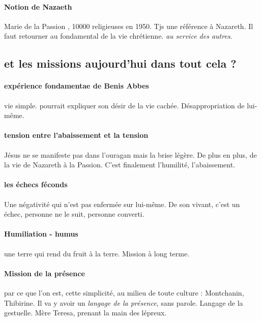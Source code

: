 \paragraph{Notion de Nazaeth} Marie de la Passion , 10000 religieuses en 1950. Tjs une référence à Nazareth. Il faut retourner au fondamental de la vie chrétienne. \textit{au service des autres}. 

\subsection{et les missions aujourd'hui dans tout cela ? }

\paragraph{expérience fondamentae de Benis Abbes} vie simple. pourrait expliquer son désir de la vie cachée. Désappropriation de lui-même.


\paragraph{tension entre l'abaissement et la tension} Jésus ne se manifeste pas dans l'ouragan mais la brise légère. De plus en plus, de la vie de Nazareth à la Passion. C'est finalement l'humilité, l'abaissement. 

\paragraph{les échecs féconds} Une négativité qui n'est pas enfermée sur lui-même. De son vivant, c'est un échec, personne ne le suit, personne converti.


\paragraph{Humiliation - humus} une terre qui rend du fruit à la terre.
Mission à long terme.


\paragraph{Mission de la présence} par ce que l'on est, cette simplicité, au milieu de toute culture : Montchanin, Thibirine.
Il va y avoir un \textit{langage de la présence}, sans parole. Langage de la gestuelle. Mère Teresa, prenant la main des lépreux.

